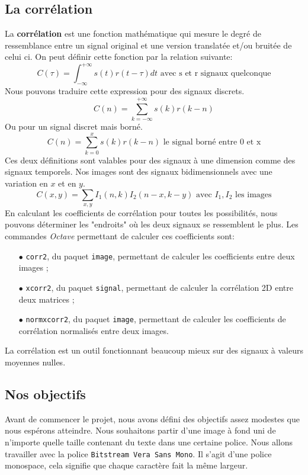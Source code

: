 \documentclass[a4paper,12pt,titlepage]{report}
\newcommand{\octave}{\textit{Octave }}
\begin{document}
		\subsection{La corrélation}
		La \textbf{corrélation} est une fonction mathématique qui mesure le degré de ressemblance entre un signal original et une version translatée et/ou bruitée de celui ci. On peut définir cette fonction par la relation suivante:
		\begin{equation}
			C(\tau)=\int_{-\infty}^{+\infty}s(t)r(t-\tau)dt \text{ avec s et r signaux quelconque}
		\end{equation}
		Nous pouvons traduire cette expression pour des signaux discrets.
		\begin{equation}
			C(n)=\sum_{k = -\infty}^{+\infty}s(k)r(k-n)	
		\end{equation}
		Ou pour un signal discret mais borné.
		\begin{equation}
			C(n)=\sum_{k = 0}^{x}s(k)r(k-n)	\text{ le signal borné entre 0 et x} 
		\end{equation}		
		Ces deux définitions sont valables pour des signaux à une dimension comme des signaux temporels. Nos images sont des signaux bidimensionnels avec une variation en $x$ et en $y$.
		\begin{equation}
			C(x,y)=\sum_{x,y} I_1(n,k)I_2(n-x,k-y) \text{ avec }I_1, I_2 \text{ les images}
		\end{equation}
		En calculant les coefficients de corrélation pour toutes les possibilités, nous pouvons déterminer les "endroits" où les deux signaux se ressemblent le plus.
		Les commandes \octave permettant de calculer ces coefficients sont:
		\begin{itemize}
		\item[$\bullet$] \texttt{corr2}, du paquet \texttt{image}, permettant de calculer les coefficients entre deux images ;
		\item[$\bullet$] \texttt{xcorr2}, du paquet \texttt{signal}, permettant de calculer la corrélation 2D entre deux matrices ;
		\item[$\bullet$] \texttt{normxcorr2}, du paquet \texttt{image}, permettant de calculer les coefficients de corrélation normalisés entre deux images. 
		\end{itemize}		
		La corrélation est un outil fonctionnant beaucoup mieux sur des signaux à valeurs moyennes nulles.
		\subsection{Nos objectifs}
		\label{objectifs}
		Avant de commencer le projet, nous avons défini des objectifs assez modestes que nous espérons atteindre. Nous souhaitons partir d'une image à fond uni de n'importe quelle taille contenant du texte dans une certaine police. Nous allons travailler avec la police \texttt{Bitstream Vera Sans Mono}. Il s'agit d'une police monospace, cela signifie que chaque caractère fait la même largeur.
		
\end{document}
